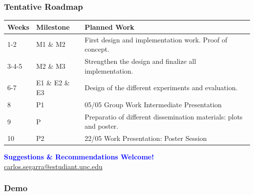 \documentclass[9pt,    %
    english,            %
    xcolor=table,       %
    envcountsect,        %
    aspectratio=169     %
]{beamer}
\begin{document}
\begin{frame}
    \frametitle{Tentative Roadmap}

    \begin{table}[h!]
        \begin{tabular}{L{1.5cm}L{1.5cm}L{10cm}}
            \hline
            \textbf{Weeks} & \textbf{Milestone} & \textbf{Planned Work} \\[3pt]
            \hline {}-2 & M1 \& M2 & First design and implementation work. Proof of concept. \\[3pt]
            3-4-5 & M2 \& M3 & Strengthen the design and finalize all implementation. \\[3pt]  
            6-7 & E1 \& E2 \& E3 & Design of the different experiments and evaluation. \\[3pt] 
            8 & P1 & 05/05 Group Work Intermediate Presentation \\[3pt] 
            9 & P & Preparatio of different dissemination materials: plots and poster. \\[3pt] 
            10 & P2 & 22/05 Work Presentation: Poster Session \\[3pt] 
            \hline
        \end{tabular}
    \end{table}

    \begin{center}
        \textbf{\textcolor{blue}{Suggestions \& Recommendations Welcome!}} \\ \href{mailto:carlos.segarra@estudiant.upc.edu}{carlos.segarra@estudiant.upc.edu}
    \end{center}

\end{frame}

\begin{frame}
    \frametitle{Demo}

\end{frame}
\end{document}
